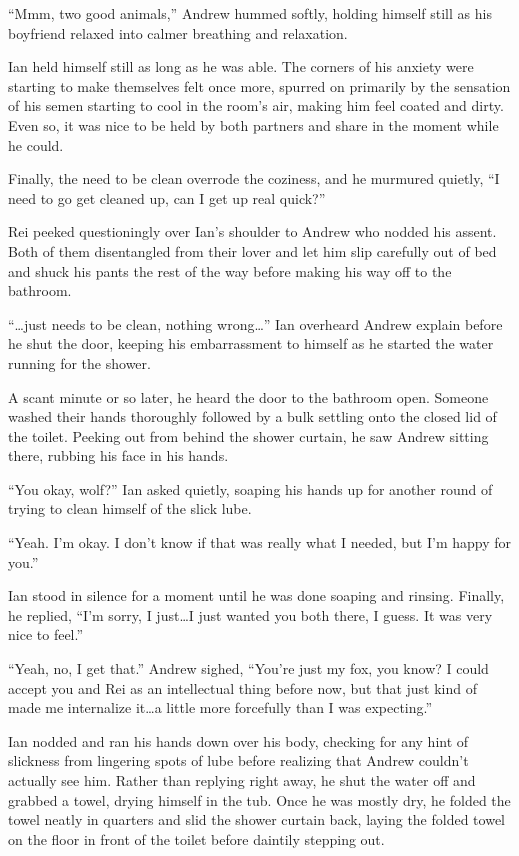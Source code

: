 ``Mmm, two good animals,'' Andrew hummed softly, holding himself still as his boyfriend relaxed into calmer breathing and relaxation.

Ian held himself still as long as he was able. The corners of his anxiety were starting to make themselves felt once more, spurred on primarily by the sensation of his semen starting to cool in the room's air, making him feel coated and dirty. Even so, it was nice to be held by both partners and share in the moment while he could.

Finally, the need to be clean overrode the coziness, and he murmured quietly, ``I need to go get cleaned up, can I get up real quick?''

Rei peeked questioningly over Ian's shoulder to Andrew who nodded his assent. Both of them disentangled from their lover and let him slip carefully out of bed and shuck his pants the rest of the way before making his way off to the bathroom.

``\ldots{}just needs to be clean, nothing wrong\ldots{}'' Ian overheard Andrew explain before he shut the door, keeping his embarrassment to himself as he started the water running for the shower.

A scant minute or so later, he heard the door to the bathroom open. Someone washed their hands thoroughly followed by a bulk settling onto the closed lid of the toilet. Peeking out from behind the shower curtain, he saw Andrew sitting there, rubbing his face in his hands.

``You okay, wolf?'' Ian asked quietly, soaping his hands up for another round of trying to clean himself of the slick lube.

``Yeah. I'm okay. I don't know if that was really what I needed, but I'm happy for you.''

Ian stood in silence for a moment until he was done soaping and rinsing. Finally, he replied, ``I'm sorry, I just\ldots{}I just wanted you both there, I guess. It was very nice to feel.''

``Yeah, no, I get that.'' Andrew sighed, ``You're just my fox, you know? I could accept you and Rei as an intellectual thing before now, but that just kind of made me internalize it\ldots{}a little more forcefully than I was expecting.''

Ian nodded and ran his hands down over his body, checking for any hint of slickness from lingering spots of lube before realizing that Andrew couldn't actually see him. Rather than replying right away, he shut the water off and grabbed a towel, drying himself in the tub. Once he was mostly dry, he folded the towel neatly in quarters and slid the shower curtain back, laying the folded towel on the floor in front of the toilet before daintily stepping out.


